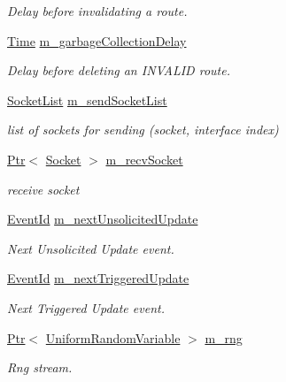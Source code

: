 \begin{DoxyCompactItemize}
\begin{DoxyCompactList}\small\item\em Delay before invalidating a route. \end{DoxyCompactList}\item 
\hyperlink{classns3_1_1Time}{Time} \hyperlink{classns3_1_1RipNg_aa42bd385be7a330206d02e2e721edc19}{m\+\_\+garbage\+Collection\+Delay}
\begin{DoxyCompactList}\small\item\em Delay before deleting an I\+N\+V\+A\+L\+ID route. \end{DoxyCompactList}\item 
\hyperlink{classns3_1_1RipNg_a30c4bb1a1f2d08a0387268645d15d328}{Socket\+List} \hyperlink{classns3_1_1RipNg_a761d304dc3d34cd528afe87c5fa8090b}{m\+\_\+send\+Socket\+List}
\begin{DoxyCompactList}\small\item\em list of sockets for sending (socket, interface index) \end{DoxyCompactList}\item 
\hyperlink{classns3_1_1Ptr}{Ptr}$<$ \hyperlink{classns3_1_1Socket}{Socket} $>$ \hyperlink{classns3_1_1RipNg_a87437a46d9f4e0951f9d4c6b11208d4f}{m\+\_\+recv\+Socket}
\begin{DoxyCompactList}\small\item\em receive socket \end{DoxyCompactList}\item 
\hyperlink{classns3_1_1EventId}{Event\+Id} \hyperlink{classns3_1_1RipNg_a673a77372c3bbc67338c52f6b0291134}{m\+\_\+next\+Unsolicited\+Update}
\begin{DoxyCompactList}\small\item\em Next Unsolicited Update event. \end{DoxyCompactList}\item 
\hyperlink{classns3_1_1EventId}{Event\+Id} \hyperlink{classns3_1_1RipNg_a382578c16a30ce7de28794defeb661e9}{m\+\_\+next\+Triggered\+Update}
\begin{DoxyCompactList}\small\item\em Next Triggered Update event. \end{DoxyCompactList}\item 
\hyperlink{classns3_1_1Ptr}{Ptr}$<$ \hyperlink{classns3_1_1UniformRandomVariable}{Uniform\+Random\+Variable} $>$ \hyperlink{classns3_1_1RipNg_adc89174a768de707315ed3cb88a6a0aa}{m\+\_\+rng}
\begin{DoxyCompactList}\small\item\em Rng stream. \end{DoxyCompactList}\item 

\end{DoxyCompactItemize}

